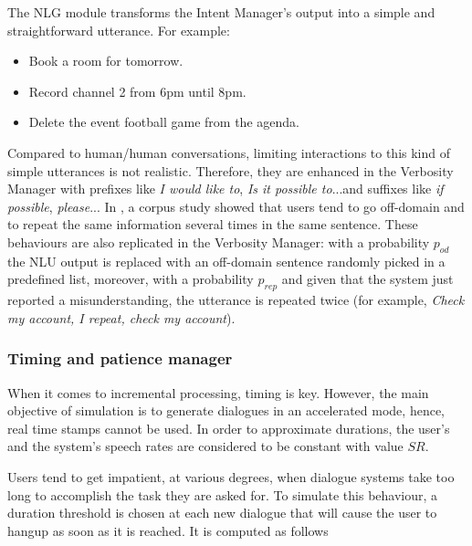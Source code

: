 				The NLG module transforms the Intent Manager's output into a simple and straightforward utterance. For example:
				
				\begin{itemize}
					\item Book a room for tomorrow.
					\item Record channel 2 from 6pm until 8pm.
					\item Delete the event football game from the agenda.
				\end{itemize}
				
				Compared to human/human conversations, limiting interactions to this kind of simple utterances is not realistic. Therefore, they are enhanced in the Verbosity Manager with prefixes like \textit{I would like to}, \textit{Is it possible to}...and suffixes like \textit{if possible}, \textit{please}... In \cite{Ghigi2014}, a corpus study showed that users tend to go off-domain and to repeat the same information several times in the same sentence. These behaviours are also replicated in the Verbosity Manager: with a probability $p_{od}$ the NLU output is replaced with an off-domain sentence randomly picked in a predefined list, moreover, with a probability $p_{rep}$ and given that the system just reported a misunderstanding, the utterance is repeated twice (for example, \textit{Check my account, I repeat, check my account}).
				
			
			\subsubsection{Timing and patience manager}
			
				When it comes to incremental processing, timing is key. However, the main objective of simulation is to generate dialogues in an accelerated mode, hence, real time stamps cannot be used. In order to approximate durations, the user's and the system's speech rates are considered to be constant with value $SR$.
				
					
					Users tend to get impatient, at various degrees, when dialogue systems take too long to accomplish the task they are asked for. To simulate this behaviour, a duration threshold is chosen at each new dialogue that will cause the user to hangup as soon as it is reached. It is computed as follows
					
